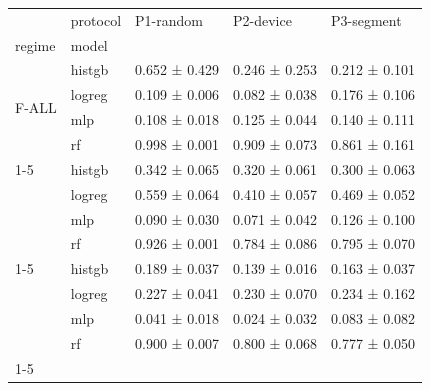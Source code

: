 \begin{tabular}{lllll}
\toprule
 & protocol & P1-random & P2-device & P3-segment \\
regime & model &  &  &  \\
\midrule
\multirow[t]{4}{*}{F-ALL} & histgb & 0.652 ± 0.429 & 0.246 ± 0.253 & 0.212 ± 0.101 \\
 & logreg & 0.109 ± 0.006 & 0.082 ± 0.038 & 0.176 ± 0.106 \\
 & mlp & 0.108 ± 0.018 & 0.125 ± 0.044 & 0.140 ± 0.111 \\
 & rf & 0.998 ± 0.001 & 0.909 ± 0.073 & 0.861 ± 0.161 \\
\cline{1-5}
\multirow[t]{4}{*}{F-BEHAV} & histgb & 0.342 ± 0.065 & 0.320 ± 0.061 & 0.300 ± 0.063 \\
 & logreg & 0.559 ± 0.064 & 0.410 ± 0.057 & 0.469 ± 0.052 \\
 & mlp & 0.090 ± 0.030 & 0.071 ± 0.042 & 0.126 ± 0.100 \\
 & rf & 0.926 ± 0.001 & 0.784 ± 0.086 & 0.795 ± 0.070 \\
\cline{1-5}
\multirow[t]{4}{*}{F-NOID} & histgb & 0.189 ± 0.037 & 0.139 ± 0.016 & 0.163 ± 0.037 \\
 & logreg & 0.227 ± 0.041 & 0.230 ± 0.070 & 0.234 ± 0.162 \\
 & mlp & 0.041 ± 0.018 & 0.024 ± 0.032 & 0.083 ± 0.082 \\
 & rf & 0.900 ± 0.007 & 0.800 ± 0.068 & 0.777 ± 0.050 \\
\cline{1-5}
\bottomrule
\end{tabular}
